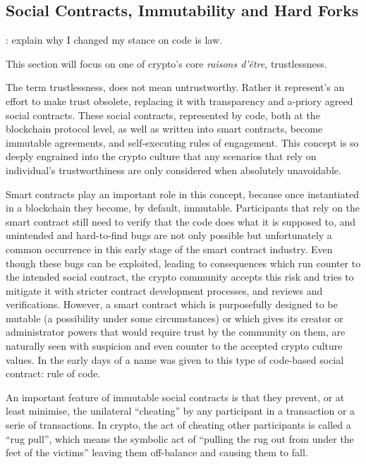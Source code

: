 \subsection{Social Contracts, Immutability and Hard Forks}


\todo : explain why I changed my stance on code is law.

This section will focus on one of crypto's core \emph{raisons d'être}, trustlessness.

The term trustlessness, does not mean untrustworthy. Rather it represent's an effort to make trust obsolete, replacing it with transparency and a-priory agreed social contracts. These social contracts, represented by code, both at the blockchain protocol level, as well as written into smart contracts, become immutable agreements, and self-executing rules of engagement. This concept is so deeply engrained into the crypto culture that any scenarios that rely on individual's trustworthiness are only considered when absolutely unavoidable.

Smart contracts play an important role in this concept, because once instantiated in a blockchain they become, by default, immutable. Participants that rely on the smart contract still need to verify that the code does what it is supposed to, and unintended and hard-to-find bugs are not only possible but unfortunately a common occurrence in this early stage of the smart contract industry. Even though these bugs can be exploited, leading to consequences which run counter to the intended social contract, the crypto community accepts this risk and tries to mitigate it with stricter contract development processes, and reviews and verifications. However, a smart contract which is purposefully designed to be mutable (a possibility under some circumstances) or which gives its creator or administrator powers that would require trust by the community on them, are naturally seen with suspicion and even counter to the accepted crypto culture values. In the early days of  a name was given to this type of code-based social contract: rule of code.

An important feature of immutable social contracts is that they prevent, or at least minimise, the unilateral ``cheating'' by any participant in a transaction or a serie of transactions. In crypto, the act of cheating other participants is called a ``rug pull'', which means the symbolic act of ``pulling the rug out from under the feet of the victims'' leaving them off-balance and causing them to fall.

